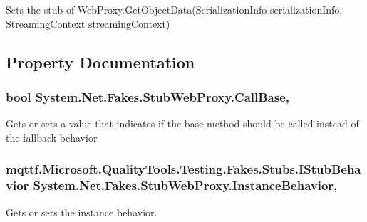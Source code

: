 Sets the stub of Web\-Proxy.\-Get\-Object\-Data(\-Serialization\-Info serialization\-Info, Streaming\-Context streaming\-Context)



\subsection{Property Documentation}
\hypertarget{class_system_1_1_net_1_1_fakes_1_1_stub_web_proxy_a81506cd18957c5c7a3bd6313d2e2574a}{
\subsubsection[{Call\-Base}]{\setlength{\rightskip}{0pt plus 5cm}bool System.\-Net.\-Fakes.\-Stub\-Web\-Proxy.\-Call\-Base\hspace{0.3cm}{\ttfamily [get]}, {\ttfamily [set]}}}\label{class_system_1_1_net_1_1_fakes_1_1_stub_web_proxy_a81506cd18957c5c7a3bd6313d2e2574a}


Gets or sets a value that indicates if the base method should be called instead of the fallback behavior

\hypertarget{class_system_1_1_net_1_1_fakes_1_1_stub_web_proxy_a946434773632126b52514aab2db7b7ed}{
\subsubsection[{Instance\-Behavior}]{\setlength{\rightskip}{0pt plus 5cm}mqttf.\-Microsoft.\-Quality\-Tools.\-Testing.\-Fakes.\-Stubs.\-I\-Stub\-Behavior System.\-Net.\-Fakes.\-Stub\-Web\-Proxy.\-Instance\-Behavior\hspace{0.3cm}{\ttfamily [get]}, {\ttfamily [set]}}}\label{class_system_1_1_net_1_1_fakes_1_1_stub_web_proxy_a946434773632126b52514aab2db7b7ed}


Gets or sets the instance behavior.

